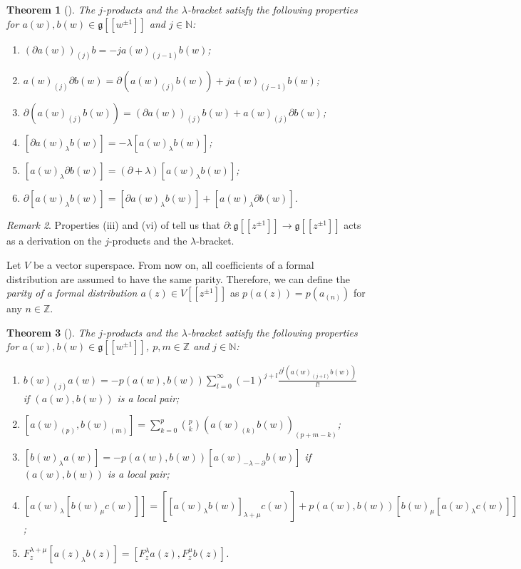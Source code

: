 \documentclass[a4paper, 12pt, reqno]{amsart}
\newtheorem{theorem}{Theorem}[section]
\theoremstyle{remark}
\newtheorem{remark}[theorem]{Remark}
\begin{document}
\begin{theorem}[{\cite[\S2.3]{nozaradan_introduction_2008}}]
  \label{thr:7}
  The $j$-products and the $\lambda$-bracket satisfy the following properties for $a(w), b(w) \in \mathfrak{g}[[w^{\pm1}]]$ and $j \in \mathbb{N}$:
  \begin{enumerate}
  \item $(\partial a(w))_{(j)}b = -ja(w)_{(j - 1)}b(w)$;
  \item $a(w)_{(j)}\partial b(w) = \partial(a(w)_{(j)}b(w)) + ja(w)_{(j - 1)}b(w)$;
  \item $\partial(a(w)_{(j)}b(w)) = (\partial a(w))_{(j)}b(w) + a(w)_{(j)}\partial b(w)$;
  \item $[\partial a(w)_{\lambda}b(w)] = -\lambda[a(w)_{\lambda}b(w)]$;
  \item $[a(w)_{\lambda}\partial b(w)] = (\partial + \lambda)[a(w)_{\lambda}b(w)]$;
  \item $\partial[a(w)_{\lambda}b(w)] = [\partial a(w)_{\lambda}b(w)] + [a(w)_{\lambda}\partial b(w)]$.
  \end{enumerate}
\end{theorem}

\begin{remark}
  \label{rmk:5}
  Properties (iii) and (vi) of  tell us that $\partial: \mathfrak{g}[[z^{\pm1}]] \to \mathfrak{g}[[z^{\pm1}]]$ acts as a derivation on the $j$-products and the $\lambda$-bracket.
\end{remark}

Let $V$ be a vector superspace.
From now on, all coefficients of a formal distribution are assumed to have the same parity.
Therefore, we can define the \emph{parity of a formal distribution $a(z) \in V[[z^{\pm1}]]$} as $p(a(z)) = p(a_{(n)})$ for any $n \in \mathbb{Z}$.

\begin{theorem}[{\cite[\S2.3]{nozaradan_introduction_2008}}]
  \label{thr:8}
  The $j$-products and the $\lambda$-bracket satisfy the following properties for $a(w), b(w) \in \mathfrak{g}[[w^{\pm1}]]$, $p, m \in \mathbb{Z}$ and $j \in \mathbb{N}$:
  \begin{enumerate}
  \item $b(w)_{(j)}a(w) = -p(a(w), b(w))\sum_{l = 0}^{\infty}(-1)^{j + l}\frac{\partial^l(a(w)_{(j + l)}b(w))}{l!}$ if $(a(w), b(w))$ is a local pair;
  \item $[a(w)_{(p)}, b(w)_{(m)}] = \sum_{k = 0}^p\binom{p}{k}(a(w)_{(k)}b(w))_{(p + m - k)}$;
  \item $[b(w)_{\lambda}a(w)] = -p(a(w), b(w))[a(w)_{-\lambda - \partial}b(w)]$ if $(a(w), b(w))$ is a local pair;
  \item $[a(w)_{\lambda}[b(w)_{\mu}c(w)]] = [[a(w)_{\lambda}b(w)]_{\lambda + \mu}c(w)] + p(a(w), b(w))[b(w)_{\mu}[a(w)_{\lambda}c(w)]]$;
  \item $F^{\lambda + \mu}_z[a(z)_{\lambda}b(z)] = [F^{\lambda}_za(z), F^{\mu}_zb(z)]$.
  \end{enumerate}
\end{theorem}
\end{document}
